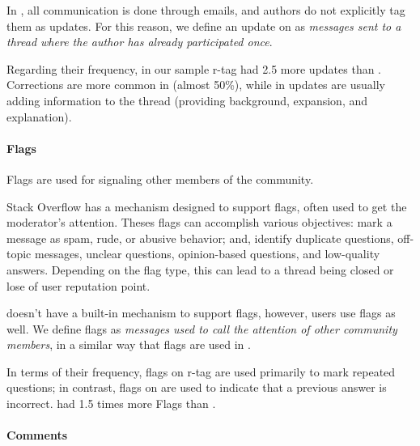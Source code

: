 In \RH, all communication is done through emails, and authors do not explicitly tag them as updates. For this reason, we define an update on \RH as \emph{messages sent to a thread where the author has already participated once}.

Regarding their frequency, in our sample \SO r-tag had 2.5 more updates than \RH. Corrections are more common in \SO (almost 50\%), while in \RH updates are usually adding information to the thread (providing background, expansion, and explanation).

\paragraph*{Flags}
Flags are used for signaling other members of the community.

Stack Overflow has a mechanism designed to support flags, often used to get the moderator's attention. Theses flags can accomplish various objectives: mark a message as spam, rude, or abusive behavior; and, identify
duplicate questions, off-topic messages, unclear questions, opinion-based questions, and low-quality
answers. Depending on the flag type, this can lead to a thread being closed or lose of user reputation point.  

\RH doesn't have a built-in mechanism to support flags, however, \RH users use flags as well. We define flags as \emph{messages used to call the attention of other community members}, in a similar way that flags are used in \SO.



In terms of their frequency, flags on \SO r-tag are used primarily to mark repeated questions; in contrast, flags on \RH are used to indicate that a previous answer is incorrect. \SO had 1.5 times more Flags than \RH.

\paragraph*{Comments}

